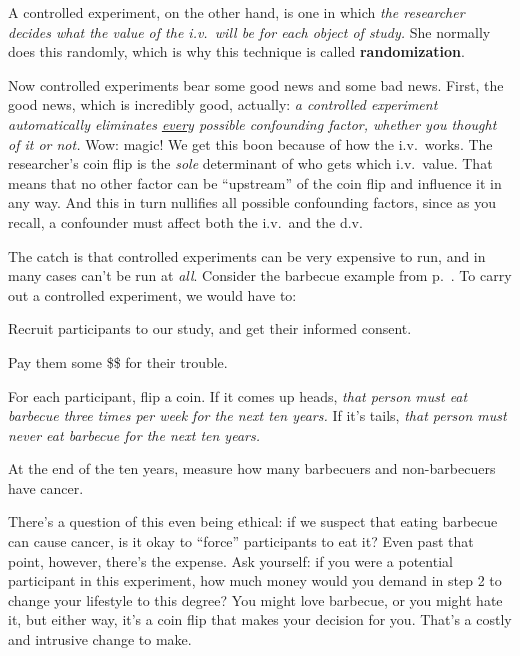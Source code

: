 
A controlled experiment, on the other hand, is one in which \textit{the
researcher decides what the value of the i.v.~will be for each object of
study.} She normally does this randomly, which is why this technique is called
\textbf{randomization}.

Now controlled experiments bear some good news and some bad news. First, the
good news, which is incredibly good, actually: \textit{a controlled experiment
automatically eliminates \underline{every} possible confounding factor, whether
you thought of it or not.} Wow: magic! We get this boon because of how the
i.v.~works. The researcher's coin flip is the \textit{sole} determinant of who
gets which i.v.~value. That means that no other factor can be ``upstream'' of
the coin flip and influence it in any way. And this in turn nullifies all
possible confounding factors, since as you recall, a confounder must affect
both the i.v.~and the d.v.

The catch is that controlled experiments can be very expensive to run, and in
many cases can't be run at \textit{all}. Consider the barbecue example from
p.~\pageref{barbecue}. To carry out a controlled experiment, we would have to:

\begin{compactenum}
\item Recruit participants to our study, and get their informed consent.
\item Pay them some \$\$ for their trouble.
\item For each participant, flip a coin. If it comes up heads, \textit{that
person must eat barbecue three times per week for the next ten years.} If it's
tails, \textit{that person must never eat barbecue for the next ten years.}
\item At the end of the ten years, measure how many barbecuers and
non-barbecuers have cancer.
\end{compactenum}

There's a question of this even being ethical: if we suspect that eating
barbecue can cause cancer, is it okay to ``force'' participants to eat it? Even
past that point, however, there's the expense. Ask yourself: if you were a
potential participant in this experiment, how much money would you demand in
step 2 to change your lifestyle to this degree? You might love barbecue, or you
might hate it, but either way, it's a coin flip that makes your decision for
you. That's a costly and intrusive change to make.

